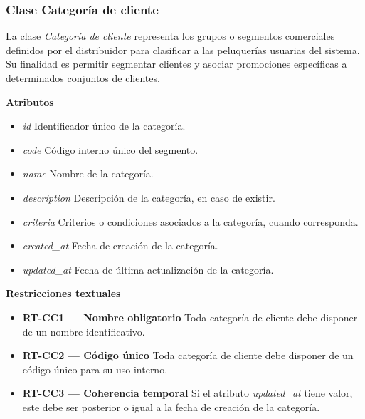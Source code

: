\subsubsection{Clase Categoría de cliente}

La clase \textit{Categoría de cliente} representa los grupos o segmentos comerciales definidos por el distribuidor para clasificar a las peluquerías usuarias del sistema. Su finalidad es permitir segmentar clientes y asociar promociones específicas a determinados conjuntos de clientes.

\textbf{Atributos}

\begin{itemize}

      \item \textit{id}
            Identificador único de la categoría.
      \item \textit{code}
            Código interno único del segmento.
      \item \textit{name}
            Nombre de la categoría.
      \item \textit{description}
            Descripción de la categoría, en caso de existir.
      \item \textit{criteria}
            Criterios o condiciones asociados a la categoría, cuando corresponda.
      \item \textit{created\_at}
            Fecha de creación de la categoría.
      \item \textit{updated\_at}
            Fecha de última actualización de la categoría.

\end{itemize}

\textbf{Restricciones textuales}

\begin{itemize}

      \item \textbf{RT-CC1 — Nombre obligatorio}
            Toda categoría de cliente debe disponer de un nombre identificativo.
      \item \textbf{RT-CC2 — Código único}
            Toda categoría de cliente debe disponer de un código único para su uso interno.
      \item \textbf{RT-CC3 — Coherencia temporal}
            Si el atributo \textit{updated\_at} tiene valor, este debe ser posterior o igual a la fecha de creación de la categoría.

\end{itemize}

